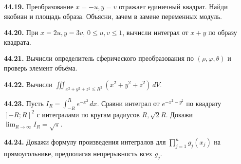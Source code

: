 \noindent\begin{minipage}[t]{\linewidth}\textbf{44.19.} Преобразование \(x=-u,y=v\) отражает единичный квадрат. Найди якобиан и площадь образа. Объясни, зачем в замене переменных модуль.\par\end{minipage}\par
\noindent\begin{minipage}[t]{\linewidth}\textbf{44.20.} При \(x=2u,y=3v\), \(0\le u,v\le1\), вычисли интеграл от \(x+y\) по образу квадрата.\par\end{minipage}\par
\noindent\begin{minipage}[t]{\linewidth}\textbf{44.21.}\starmark{} Вычисли определитель сферического преобразования по \((\rho,\varphi,\theta)\) и проверь элемент объёма.\par\end{minipage}\par
\noindent\begin{minipage}[t]{\linewidth}\textbf{44.22.}\starmark{} Вычисли \(\iiint_{x^2+y^2+z^2\le R^2}(x^2+y^2+z^2)\,dV\).\par\end{minipage}\par
\noindent\begin{minipage}[t]{\linewidth}\textbf{44.23.}\starmark{} Пусть \(I_R=\int_{-R}^Re^{-x^2}\,dx\). Сравни интеграл от \(e^{-x^2-y^2}\) по квадрату \([-R;R]^2\) с интегралами по кругам радиусов \(R,\sqrt2R\). Докажи \(\lim_{R\to\infty}I_R=\sqrt\pi\).\par\end{minipage}\par
\noindent\begin{minipage}[t]{\linewidth}\textbf{44.24.}\starmark{} Докажи формулу произведения интегралов для \(\prod_{j=1}^ng_j(x_j)\) на прямоугольнике, предполагая непрерывность всех \(g_j\).\par\end{minipage}\par
\endgroup
